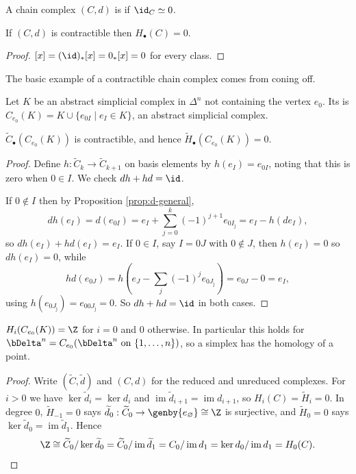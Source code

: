 \begin{definition}
	A chain complex $(C,d)$ is  if $\id_C \simeq 0$.
\end{definition}

\begin{lemma} \label{lem:contractible-chain}
	If $(C,d)$ is contractible then $H_\bullet(C) = 0$.
\end{lemma}
\begin{proof}
	$[x] = (\id)_*[x] = 0_*[x] = 0$ for every class.
\end{proof}

The basic example of a contractible chain complex comes from coning off.

\begin{definition}
	Let $K$ be an abstract simplicial complex in $\Delta^n$ not containing the vertex $e_0$. Its  is $C_{e_0}(K) = K \cup \{e_{0I} \mid e_I \in K\}$, an abstract simplicial complex.
\end{definition}

\begin{proposition} \label{prop:cone-contractible}
	$\widetilde C_\bullet(C_{e_0}(K))$ is contractible, and hence $\widetilde H_\bullet(C_{e_0}(K)) = 0$.
\end{proposition}
\begin{proof}
	Define $h: \widetilde C_k \to \widetilde C_{k+1}$ on basis elements by $h(e_I) = e_{0I}$, noting that this is zero when $0 \in I$. We check $dh + hd = \id$.

	If $0 \notin I$ then by Proposition \ref{prop:d-general},
	$$
	dh(e_I) = d(e_{0I}) = e_I + \sum_{j=0}^{k}(-1)^{j+1}e_{0I_{\hat\jmath}} = e_I - h(d e_I),
	$$
	so $dh(e_I)+hd(e_I) = e_I$. If $0 \in I$, say $I = 0J$ with $0 \notin J$, then $h(e_I) = 0$ so $dh(e_I) = 0$, while
	$$
	hd(e_{0J}) = h\left(e_J - \sum_j (-1)^{j}e_{0J_{\hat\jmath}}\right) = e_{0J} - 0 = e_I,
	$$
	using $h(e_{0J_{\hat\jmath}}) = e_{00J_{\hat\jmath}} = 0$. So $dh+hd = \id$ in both cases.
\end{proof}

\begin{corollary} \label{cor:cone-homology}
	$H_i(C_{e_0}(K)) = \Z$ for $i=0$ and $0$ otherwise. In particular this holds for $\bDelta^n = C_{e_0}(\bDelta^{n}\text{ on } \{1,\dots,n\})$, so a simplex has the homology of a point.
\end{corollary}
\begin{proof}
	Write $(\widetilde C, \widetilde d)$ and $(C,d)$ for the reduced and unreduced complexes. For $i > 0$ we have $\ker \widetilde d_i = \ker d_i$ and $\operatorname{im}\widetilde d_{i+1} = \operatorname{im}d_{i+1}$, so $H_i(C) = \widetilde H_i = 0$. In degree $0$, $\widetilde H_{-1} = 0$ says $\widetilde d_0: \widetilde C_0 \to \genby{e_\varnothing}\cong\Z$ is surjective, and $\widetilde H_0 = 0$ says $\ker\widetilde d_0 = \operatorname{im}\widetilde d_1$. Hence
	$$
	\Z \cong \widetilde C_0/\ker\widetilde d_0 = \widetilde C_0 /\operatorname{im}\widetilde d_1 = C_0/\operatorname{im}d_1 = \ker d_0/\operatorname{im}d_1 = H_0(C). \qedhere
	$$
\end{proof}

